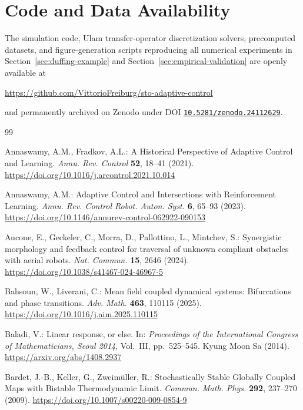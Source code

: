 \documentclass[11pt]{article}
\theoremstyle{definition}
\theoremstyle{remark}
\begin{document}
{\section*{Code and Data Availability}
The simulation code, Ulam transfer-operator discretization solvers, precomputed datasets, and figure-generation scripts reproducing all numerical experiments in Section~\ref{sec:duffing-example} and Section~\ref{sec:empirical-validation} are openly available at
\begin{center}
  \url{https://github.com/VittorioFreiburg/sto-adaptive-control}
\end{center}
and permanently archived on Zenodo under DOI \href{https://doi.org/10.5281/zenodo.24112629}{\texttt{10.5281/zenodo.24112629}}.

\begin{thebibliography}{99}

Annaswamy, A.M., Fradkov, A.L.: A Historical Perspective of Adaptive Control and Learning. \emph{Annu. Rev. Control} \textbf{52}, 18--41 (2021). \url{https://doi.org/10.1016/j.arcontrol.2021.10.014}

Annaswamy, A.M.: Adaptive Control and Intersections with Reinforcement Learning. \emph{Annu. Rev. Control Robot. Auton. Syst.} \textbf{6}, 65--93 (2023). \url{https://doi.org/10.1146/annurev-control-062922-090153}

Aucone, E., Geckeler, C., Morra, D., Pallottino, L., Mintchev, S.: Synergistic morphology and feedback control for traversal of unknown compliant obstacles with aerial robots. \emph{Nat. Commun.} \textbf{15}, 2646 (2024). \url{https://doi.org/10.1038/s41467-024-46967-5}

Bahsoun, W., Liverani, C.: Mean field coupled dynamical systems: Bifurcations and phase transitions. \emph{Adv. Math.} \textbf{463}, 110115 (2025). \url{https://doi.org/10.1016/j.aim.2025.110115}

Baladi, V.:
Linear response, or else.
In: \emph{Proceedings of the International Congress of
Mathematicians, Seoul 2014}, Vol.~III, pp.~525--545.
Kyung Moon Sa (2014).
\url{https://arxiv.org/abs/1408.2937}

Bardet, J.-B., Keller, G., Zweim\"uller, R.:
Stochastically Stable Globally Coupled Maps with Bistable
Thermodynamic Limit.
\emph{Commun. Math. Phys.} \textbf{292}, 237--270 (2009).
\url{https://doi.org/10.1007/s00220-009-0854-9}


\end{thebibliography}}
\end{document}

